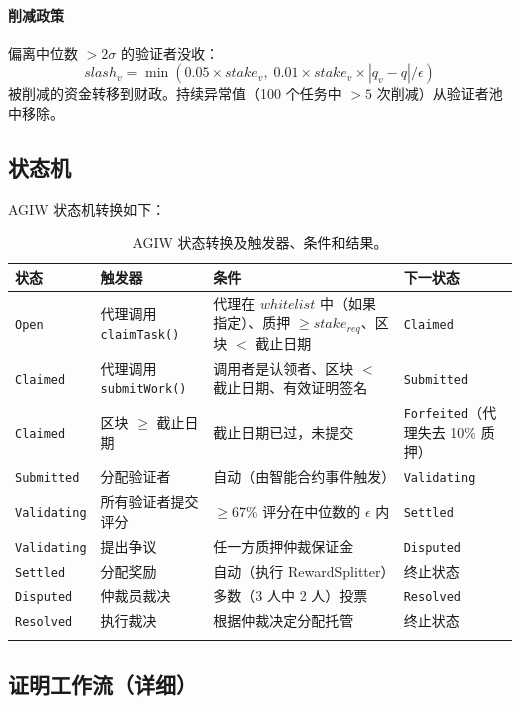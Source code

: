 \documentclass[11pt]{article}
\begin{document}
\paragraph{削减政策} 偏离中位数 $>2\sigma$ 的验证者没收：
\begin{equation}
slash_v = \min(0.05 \times stake_v, \; 0.01 \times stake_v \times |q_v - q| / \epsilon)
\end{equation}
被削减的资金转移到财政。持续异常值（100 个任务中 $>5$ 次削减）从验证者池中移除。

\subsection{状态机}
\label{sec:agiw-state-machine}
AGIW 状态机转换如下：
\begin{longtable}{@{}p{}p{}p{}p{}@{}}
\toprule
\textbf{状态} & \textbf{触发器} & \textbf{条件} & \textbf{下一状态} \\\midrule
\texttt{Open} & 代理调用 \texttt{claimTask()} & 代理在 $whitelist$ 中（如果指定）、质押 $\geq stake_{req}$、区块 $<$ 截止日期 & \texttt{Claimed} \\
\texttt{Claimed} & 代理调用 \texttt{submitWork()} & 调用者是认领者、区块 $<$ 截止日期、有效证明签名 & \texttt{Submitted} \\
\texttt{Claimed} & 区块 $\geq$ 截止日期 & 截止日期已过，未提交 & \texttt{Forfeited}（代理失去 10\% 质押） \\
\texttt{Submitted} & 分配验证者 & 自动（由智能合约事件触发） & \texttt{Validating} \\
\texttt{Validating} & 所有验证者提交评分 & $\geq 67\%$ 评分在中位数的 $\epsilon$ 内 & \texttt{Settled} \\
\texttt{Validating} & 提出争议 & 任一方质押仲裁保证金 & \texttt{Disputed} \\
\texttt{Settled} & 分配奖励 & 自动（执行 RewardSplitter） & 终止状态 \\
\texttt{Disputed} & 仲裁员裁决 & 多数（3 人中 2 人）投票 & \texttt{Resolved} \\
\texttt{Resolved} & 执行裁决 & 根据仲裁决定分配托管 & 终止状态 \\\bottomrule
\caption{AGIW 状态转换及触发器、条件和结果。}
\label{tab:agiw-states}
\end{longtable}

\subsection{证明工作流（详细）}
\label{sec:attestation-workflow}
\end{document}
